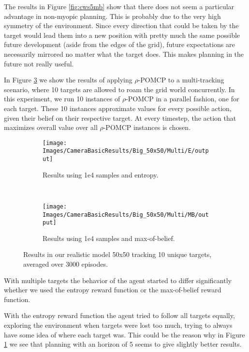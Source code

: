The results in Figure \ref{fig:cws5mb} show that there does not seem a particular advantage in
non-myopic planning. This is probably due to the very high symmetry of the environment. Since every
direction that could be taken by the target would lead them into a new position with pretty much the
same possible future development (aside from the edges of the grid), future expectations are
necessarily mirrored no matter what the target does. This makes planning in the future not really
useful.

In Figure \ref{fig:cwb10} we show the results of applying $\rho$-POMCP to a multi-tracking scenario, where
10 targets are allowed to roam the grid world concurrently. In this experiment, we run 10 instances
of $\rho$-POMCP in a parallel fashion, one for each target. These 10 instances approximate values for
every possible action, given their belief on their respective target. At every timestep, the action that
maximizes overall value over all $\rho$-POMCP instances is chosen.

\begin{figure}[ht!]
        \centering
        \begin{subfigure}[t]{0.5\textwidth}
                \texttt{[image: Images/CameraBasicResults/Big\_50x50/Multi/E/output]}
                \caption{Results using 1e4 samples and entropy.}
                \label{fig:cwb4e10}
        \end{subfigure}%
        ~ %
        \begin{subfigure}[t]{0.5\textwidth}
                \texttt{[image: Images/CameraBasicResults/Big\_50x50/Multi/MB/output]}
                \caption{Results using 1e4 samples and max-of-belief.}
                \label{fig:cwb5mb10}
        \end{subfigure}
        \caption{Results in our realistic model 50x50 tracking 10 unique targets, averaged over 3000 episodes.}
        \label{fig:cwb10}
\end{figure}

With multiple targets the behavior of the agent started to differ significantly whether we used the
entropy reward function or the max-of-belief reward function.

With the entropy reward function the agent tried to follow all targets equally, exploring the
environment when targets were lost too much, trying to always have some idea of where each target
was. This could be the reason why in Figure \ref{fig:cwb4e10} we see that planning with an horizon
of 5 seems to give slightly better results.

